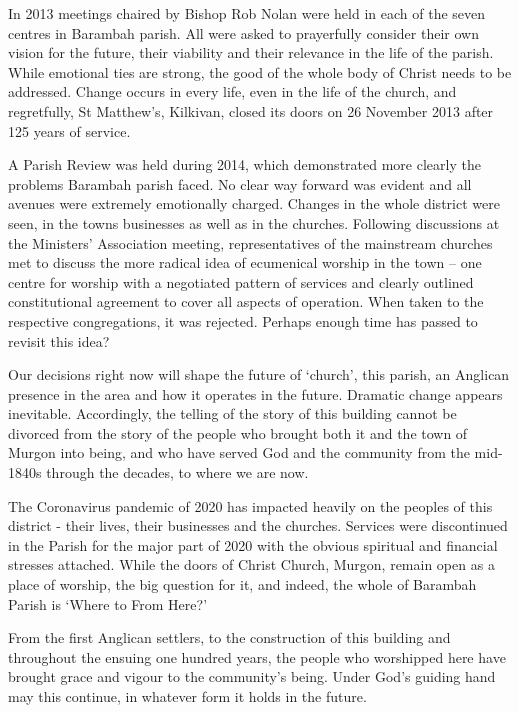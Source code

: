In 2013 meetings chaired by Bishop Rob Nolan were held in each of the seven centres in Barambah parish. All were asked to prayerfully consider their own vision for the future, their viability and their relevance in the life of the parish. While emotional ties are strong, the good of the whole body of Christ needs to be addressed. Change occurs in every life, even in the life of the church, and regretfully, St Matthew's, Kilkivan, closed its doors on 26 November 2013 after 125 years of service.



\balance


A Parish Review was held during 2014, which demonstrated more clearly the problems Barambah parish faced. No clear way forward was evident and all avenues were extremely emotionally charged. Changes in the whole district were seen, in the towns businesses as well as in the churches. Following discussions at the Ministers' Association meeting, representatives of the mainstream churches met to discuss the more radical idea of ecumenical worship in the town -- one centre for worship with a negotiated pattern of services and clearly outlined constitutional agreement to cover all aspects of operation. When taken to the respective congregations, it was rejected. Perhaps enough time has passed to revisit this idea?



Our decisions right now will shape the future of `church', this parish, an Anglican presence in the area and how it operates in the future. Dramatic change appears inevitable. Accordingly, the telling of the story of this building cannot be divorced from the story of the people who brought both it and the town of Murgon into being, and who have served God and the community from the mid-1840s through the decades, to where we are now.



The Coronavirus pandemic of 2020 has impacted heavily on the peoples of this district - their lives, their businesses and the churches. Services were discontinued in the Parish for the major part of 2020 with the obvious spiritual and financial stresses attached. While the doors of Christ Church, Murgon, remain open as a place of worship, the big question for it, and indeed, the whole of Barambah Parish is `Where to From Here?'



From the first Anglican settlers, to the construction of this building and throughout the ensuing one hundred years, the people who worshipped here have brought grace and vigour to the community's being. Under God's guiding hand may this continue, in whatever form it holds in the future.



